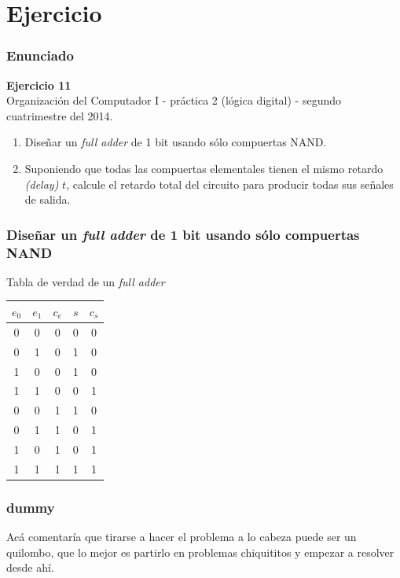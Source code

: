 \documentclass[mathserif,hyperref]{beamer}
\begin{document}
\section{Ejercicio}

\begin{frame}
\frametitle{Enunciado}
\textbf{Ejercicio 11} \\
{\tiny Organización del Computador I - práctica 2 (lógica digital) - segundo
cuatrimestre del 2014.}
\begin{enumerate}
  \item Diseñar un \textit{full adder} de 1 bit usando sólo compuertas NAND.
  \item Suponiendo que todas las compuertas elementales tienen el mismo
  retardo \textit{(delay)} $t$, calcule el retardo total del circuito para
  producir todas sus señales de salida.
\end{enumerate}
\end{frame}


\begin{frame}
\frametitle{\small Diseñar un \textit{full adder} de 1 bit usando sólo
compuertas NAND}
Tabla de verdad de un \textit{full adder}
\begin{center}\begin{tabular}{| c | c | c || c | c |}
  \hline
  $e_0$ & $e_1$ & $c_e$ & $s$ & $c_s$ \\ \hline
    0   &   0   &   0   &  0  &   0   \\
    0   &   1   &   0   &  1  &   0   \\
    1   &   0   &   0   &  1  &   0   \\
    1   &   1   &   0   &  0  &   1   \\
    0   &   0   &   1   &  1  &   0   \\
    0   &   1   &   1   &  0  &   1   \\
    1   &   0   &   1   &  0  &   1   \\
    1   &   1   &   1   &  1  &   1   \\
  \hline
\end{tabular}\end{center}
\end{frame}


\begin{frame}
\frametitle{dummy}
Acá comentaría que tirarse a hacer el problema a lo cabeza puede ser un
quilombo, que lo mejor es partirlo en problemas chiquititos y empezar a
resolver desde ahí.
\end{frame}
\end{document}
